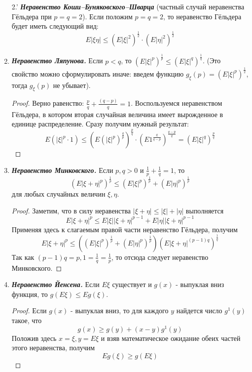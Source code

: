 \begin{enumerate}
\begin{proof}
		\[ \Rightarrow E |\xi \eta| \le (E |\xi|^r)^{\frac{1}{r}} (E |\xi|^s)^{\frac{1}{s}} \]
	\end{proof}
	\item[2.'] \textit{\textbf{Неравенство Коши–Буняковского–Шварца}} (частный случай неравенства Гёльдера при $p=q=2$). Если положим $p = q = 2$, то неравенство Гёльдера будет иметь следующий вид:
	\[ E |\xi \eta| \le ( E |\xi|^2 )^{\frac{1}{2}} \cdot ( E |\eta|^2 )^{\frac{1}{2}} \]
	\item \textit{\textbf{Неравенство Ляпунова.}} Если $p < q$, то $(E |\xi|^p)^{\frac{1}{p}} \le (E |\xi|^q)^{\frac{1}{q}}$. (Это свойство можно сформулировать иначе: введем функцию $g_{\xi}(p) = (E |\xi|^p)^{\frac{1}{2}}$, тогда $g_{\xi}(p)$ не убывает).
	\begin{proof}
		Верно равенство: $\frac{p}{q} + \frac{(q-p)}{q} = 1$. Воспользуемся неравенством Гёльдера, в котором вторая случайная величина имеет вырожденное в единице распределение. Сразу получим нужный результат:
		\[ E(|\xi|^p \cdot 1) \le (E(|\xi|^p)^{\frac{q}{p}})^{\frac{p}{q}} \cdot (E1^{\frac{q}{q-p}})^{\frac{q-p}{q}} = (E|\xi|^q)^{\frac{p}{q}} \]
	\end{proof}
	\item \textit{\textbf{Неравенство Минковского.}} Если $p, q > 0$ и $\frac{1}{p} + \frac{1}{q} = 1$, то
	\[ ( E |\xi + \eta|^p )^{\frac{1}{p}} \le ( E |\xi|^p )^{\frac{1}{p}} + ( E |\eta|^p )^{\frac{1}{p}} \]
	для любых случайных величин $\xi, \eta$.
	\begin{proof}
		Заметим, что в силу неравенства $|\xi + \eta| \le |\xi| + |\eta|$ выполняется
		\[ E |\xi + \eta|^p \le E |\xi| |\xi + \eta|^{p-1} + E |\eta| |\xi + \eta|^{p-1} \]
		Применяя здесь к слагаемым правой части неравенство Гёльдера, получим
		\[ E |\xi + \eta|^p \le ( ( E |\xi|^p )^{\frac{1}{p}} + ( E |\eta|^p )^{\frac{1}{p}} ) ( E |\xi + \eta|^{(p-1)q} )^{\frac{1}{q}} \]
		Так как $(p-1)q=p, 1=\frac{1}{q}=\frac{1}{p}$, то отсюда следует неравенство Минковского.
	\end{proof}
	\item \textit{\textbf{Неравенство Йенсена.}} Если $E\xi$ существует и $g(x)$ - выпуклая вниз функция, то $g(E\xi) \le E g(\xi)$.
	\begin{proof}
		Если $g(x)$ - выпуклая вниз, то для каждого $y$ найдется число $g^1(y)$ такое, что
		\[ g(x) \ge g(y) + (x-y)g^1(y) \]
		Положив здесь $x=\xi, y = E\xi$ и взяв математическое ожидание обеих частей этого неравенства, получим
		\[ Eg(\xi) \ge g(E\xi) \]
	\end{proof}

\end{enumerate}
